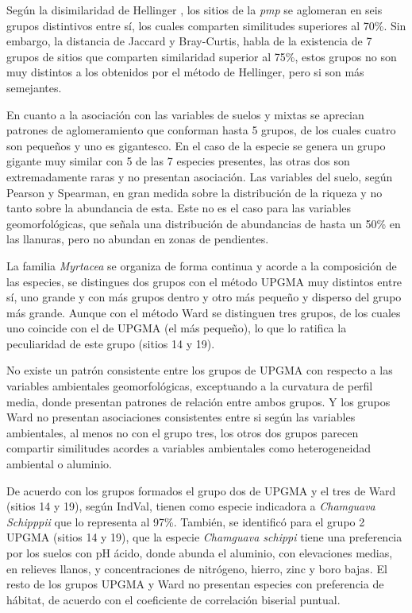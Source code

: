 \documentclass[11pt,]{article}
\begin{document}
Según la disimilaridad de Hellinger , los sitios de la \emph{pmp} se
aglomeran en seis grupos distintivos entre sí, los cuales comparten
similitudes superiores al 70\%. Sin embargo, la distancia de Jaccard y
Bray-Curtis, habla de la existencia de 7 grupos de sitios que comparten
similaridad superior al 75\%, estos grupos no son muy distintos a los
obtenidos por el método de Hellinger, pero si son más semejantes.

En cuanto a la asociación con las variables de suelos y mixtas se
aprecian patrones de aglomeramiento que conforman hasta 5 grupos, de los
cuales cuatro son pequeños y uno es gigantesco. En el caso de la especie
se genera un grupo gigante muy similar con 5 de las 7 especies
presentes, las otras dos son extremadamente raras y no presentan
asociación. Las variables del suelo, según Pearson y Spearman, en gran
medida sobre la distribución de la riqueza y no tanto sobre la
abundancia de esta. Este no es el caso para las variables
geomorfológicas, que señala una distribución de abundancias de hasta un
50\% en las llanuras, pero no abundan en zonas de pendientes.

La familia \emph{Myrtacea} se organiza de forma continua y acorde a la
composición de las especies, se distingues dos grupos con el método
UPGMA muy distintos entre sí, uno grande y con más grupos dentro y otro
más pequeño y disperso del grupo más grande. Aunque con el método Ward
se distinguen tres grupos, de los cuales uno coincide con el de UPGMA
(el más pequeño), lo que lo ratifica la peculiaridad de este grupo
(sitios 14 y 19).

No existe un patrón consistente entre los grupos de UPGMA con respecto a
las variables ambientales geomorfológicas, exceptuando a la curvatura de
perfil media, donde presentan patrones de relación entre ambos grupos. Y
los grupos Ward no presentan asociaciones consistentes entre si según
las variables ambientales, al menos no con el grupo tres, los otros dos
grupos parecen compartir similitudes acordes a variables ambientales
como heterogeneidad ambiental o aluminio.

De acuerdo con los grupos formados el grupo dos de UPGMA y el tres de
Ward (sitios 14 y 19), según IndVal, tienen como especie indicadora a
\emph{Chamguava Schipppii} que lo representa al 97\%. También, se
identificó para el grupo 2 UPGMA (sitios 14 y 19), que la especie
\emph{Chamguava schippi} tiene una preferencia por los suelos con pH
ácido, donde abunda el aluminio, con elevaciones medias, en relieves
llanos, y concentraciones de nitrógeno, hierro, zinc y boro bajas. El
resto de los grupos UPGMA y Ward no presentan especies con preferencia
de hábitat, de acuerdo con el coeficiente de correlación biserial
puntual.
\end{document}
